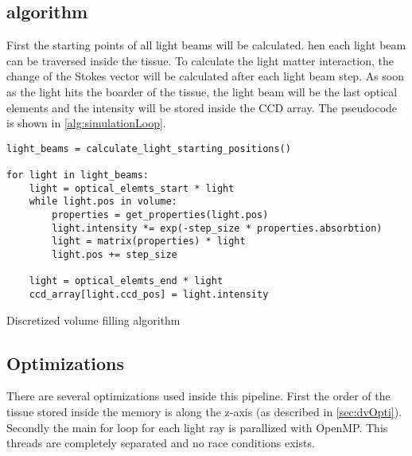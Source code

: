 \subsection{algorithm}
%
First the starting points of all light beams will be calculated.
hen each light beam can be traversed inside the tissue.
To calculate the light matter interaction, the change of the Stokes vector will be calculated after each light beam step.
As soon as the light hits the boarder of the tissue, the light beam will be the last optical elements and the intensity will be stored inside the \ac{CCD} array.
The pseudocode is shown in \cref{alg:simulationLoop}.
%
\begin{lstfloat}[!tb]
\lstset{style=python}
\begin{lstlisting}[]
light_beams = calculate_light_starting_positions()

for light in light_beams:
    light = optical_elemts_start * light
    while light.pos in volume:
        properties = get_properties(light.pos)
        light.intensity *= exp(-step_size * properties.absorbtion)
        light = matrix(properties) * light
        light.pos += step_size
   
    light = optical_elemts_end * light
    ccd_array[light.ccd_pos] = light.intensity
\end{lstlisting}
\caption{Discretized volume filling algorithm}
\label{alg:simulationLoop}
\end{lstfloat}
%
%
%
\subsection{Optimizations}
%
There are several optimizations used inside this pipeline.
First the order of the tissue stored inside the memory is along the z-axis (as described in \cref{sec:dvOpti}).
Secondly the main for loop for each light ray is parallized with \ac{OpenMP}.
This threads are completely separated and no race conditions exists.
%
%
%
